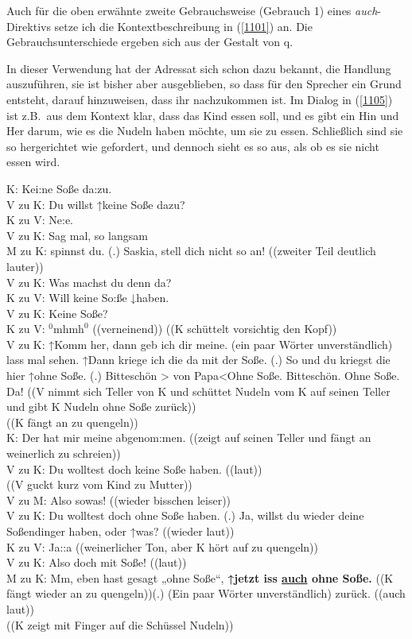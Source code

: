 Auch für die oben erwähnte zweite Gebrauchsweise (Gebrauch 1) eines \textit{auch}-Direktivs setze ich die Kontextbeschreibung in (\ref{1101}) an. Die Gebrauchsunterschiede ergeben sich aus der Gestalt von q. 

In dieser Verwendung hat der Adressat sich schon dazu bekannt, die Handlung auszuführen, sie ist bisher aber ausgeblieben, so dass für den Sprecher ein Grund entsteht, darauf hinzuweisen, dass ihr nachzukommen ist. Im Dialog in (\ref{1105}) ist z.B.\ aus dem Kontext klar, dass das Kind essen soll, und es gibt ein Hin und Her darum, wie es die Nudeln haben möchte, um sie zu essen. Schließlich sind sie so hergerichtet wie gefordert, und dennoch sieht es so aus, als ob es sie nicht essen wird.\largerpage[2]

\begin{exe}
	\ex\label{1105} 

 	K: Kei:ne Soße da:zu.\\
	V zu K: Du willst ↑keine Soße dazu?\\
	K zu V: Ne:e.\\
	V zu K: Sag mal, so langsam\\
	M zu K: spinnst du. (.) Saskia, stell dich nicht so an! ((zweiter Teil deutlich lauter))\\
	V zu K: Was machst du denn da?\\
	K zu V: Will keine So:ße ↓haben.\\
	V zu K: Keine Soße?\\
	K zu V: $^{0}\textrm{mhmh}^{0}$ ((verneinend)) ((K schüttelt vorsichtig den Kopf))\\
	V zu K: ↑Komm her, dann geb ich dir meine. (ein paar Wörter unverständlich) lass mal sehen. ↑Dann kriege ich die da mit der Soße. (.) 	So und du kriegst die hier ↑ohne Soße. (.) Bitteschön > von Papa\textless Ohne Soße. Bitteschön. Ohne Soße. Da! ((V nimmt sich Teller von K und 		schüttet Nudeln vom K auf seinen Teller und gibt K Nudeln ohne Soße zurück))\\
	((K fängt an zu quengeln))\\
	K: Der hat mir meine abgenom:men. ((zeigt auf seinen Teller und fängt an weinerlich zu schreien))\\
	V zu K: Du wolltest doch keine Soße haben. ((laut))\\
	((V guckt kurz vom Kind zu Mutter))\\
	V zu M: Also sowas! ((wieder bisschen leiser))\\
	V zu K: Du wolltest doch ohne Soße haben. (.) Ja, willst du wieder deine Soßendinger haben, oder ↑was? ((wieder laut))\\
	K zu V: Ja::a ((weinerlicher Ton, aber K hört auf zu quengeln))\\
	V zu K: Also doch mit Soße! ((laut))\\
	M zu K: Mm, eben hast gesagt „ohne Soße“, \textbf{↑jetzt iss \ul{auch} ohne Soße.} ((K fängt wieder an zu quengeln))(.) (Ein 	paar Wörter unverständlich) zurück. ((auch laut))\\
	((K zeigt mit Finger auf die Schüssel Nudeln))\hfill\hbox{\citep[32--33]{Keller2015}}
\end{exe}

